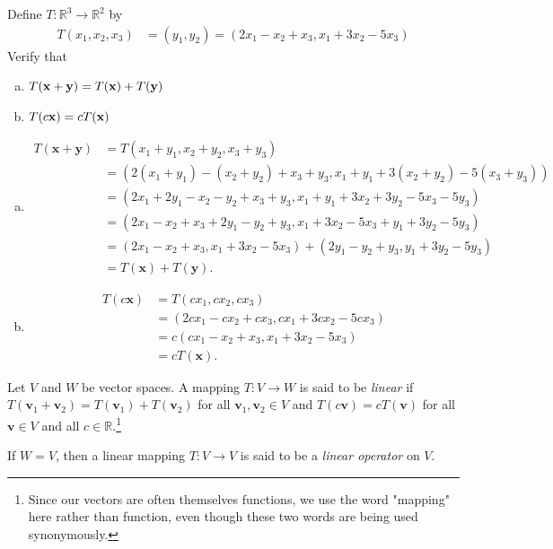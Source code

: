 \documentclass[12pt,letterpaper,reqno]{article}
\numberwithin{equation}{section}
\begin{document}
\begin{exercise}\label{ex:r_3_to_r_2}
Define $T:\mathbb{R}^3 \to \mathbb{R}^2$ by
\begin{align*}
T(x_1,x_2,x_3)&=(y_1,y_2)=(2x_1-x_2+x_3, x_1+3x_2-5x_3)
\end{align*}
Verify that
\begin{enumerate}[(a)]
	\item $T({\bf x}+{\bf y})=T({\bf x})+T({\bf y})$
	\item $T(c{\bf x})=cT({\bf x})$
\end{enumerate}	
\end{exercise}
\newpage 
{\color{red}
\begin{solution}
	\begin{enumerate}[(a)] Let $\mathbf{x}=(x_1,x_2,x_3)$ and $\mathbf{y}=(y_1,y_2,y_3)$. Then
		\item 
		\begin{align*}
			T(\mathbf{x}+\mathbf{y})&=T(x_1+y_1,x_2+y_2,x_3+y_3) \\
			&=(2(x_1+y_1)-(x_2+y_2)+x_3+y_3,x_1+y_1+3(x_2+y_2)-5(x_3+y_3)) \\
			&=(2x_1+2y_1-x_2-y_2+x_3+y_3,x_1+y_1+3x_2+3y_2-5x_3-5y_3) \\
			&=(2x_1-x_2+x_3+2y_1-y_2+y_3,x_1+3x_2-5x_3+y_1+3y_2-5y_3) \\
			&=(2x_1-x_2+x_3,x_1+3x_2-5x_3)+(2y_1-y_2+y_3,y_1+3y_2-5y_3) \\
			&=T(\mathbf{x})+T(\mathbf{y}).
		\end{align*}
		\item 
		\begin{align*}
			T(c\mathbf{x})&=T(cx_1,cx_2,cx_3) \\
			&=(2cx_1-cx_2+cx_3,cx_1+3cx_2-5cx_3) \\
			&=c(cx_1-x_2+x_3,x_1+3x_2-5x_3) \\
			&=cT(\mathbf{x}).
		\end{align*}
	\end{enumerate}
\end{solution}}

\begin{defn}\label{def:linear_mapping}
	Let $V$ and $W$ be vector spaces. A mapping $T:V \to W$ is said to be \emph{linear} if $T(\mathbf{v}_1+\mathbf{v}_2)=T(\mathbf{v}_1)+T(\mathbf{v}_2)$ for all $\mathbf{v}_1, \mathbf{v}_2 \in V$ and $T(c\mathbf{v})=cT(\mathbf{v})$ for all $\mathbf{v} \in V$ and all $c \in \mathbb{R}$.\footnote{Since our vectors are often themselves functions, we use the word "mapping" here rather than function, even though these two words are being used synonymously.} 
	
	If $W=V$, then a linear mapping $T:V \to V$ is said to be a \emph{linear operator} on $V$.	
\end{defn}
\end{document}
